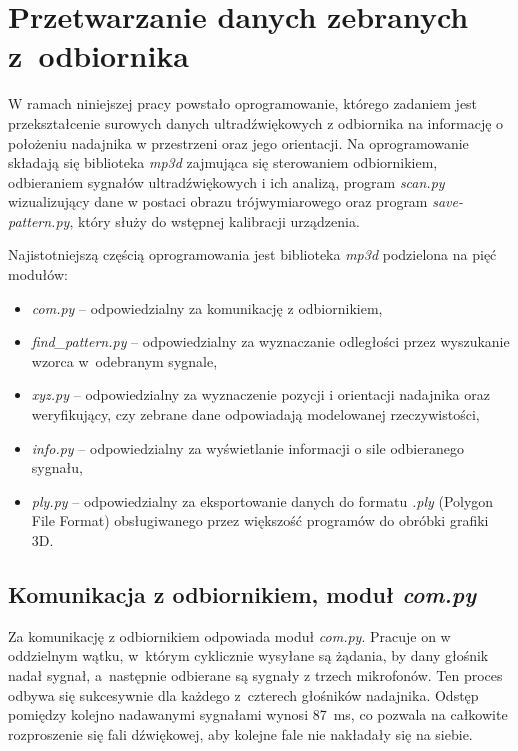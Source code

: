 
\chapter{Przetwarzanie danych zebranych z~odbiornika}

W ramach niniejszej pracy powstało oprogramowanie, którego zadaniem jest
przekształcenie surowych danych ultradźwiękowych 
z odbiornika na informację o położeniu nadajnika w przestrzeni oraz jego orientacji.
Na oprogramowanie składają się biblioteka \textit{mp3d} zajmująca się
sterowaniem odbiornikiem, odbieraniem sygnałów ultradźwiękowych i ich analizą, program \textit{scan.py}
wizualizujący dane w postaci obrazu trójwymiarowego oraz program \textit{save-pattern.py},
który służy do wstępnej kalibracji urządzenia.

Najistotniejszą częścią oprogramowania jest biblioteka \textit{mp3d} podzielona na pięć modułów:
\begin{itemize}
 \item \textit{com.py} --  odpowiedzialny za komunikację z odbiornikiem,
 \item \textit{find\_pattern.py} --  odpowiedzialny za wyznaczanie odległości przez wyszukanie wzorca w~odebranym sygnale,
 \item \textit{xyz.py} --  odpowiedzialny za wyznaczenie pozycji i orientacji nadajnika oraz  weryfikujący, 
 czy zebrane dane odpowiadają modelowanej rzeczywistości,
 \item \textit{info.py} --  odpowiedzialny za wyświetlanie informacji o sile odbieranego sygnału,
 \item \textit{ply.py} --  odpowiedzialny za eksportowanie danych do formatu \textit{.ply}
    (Polygon File Format) obsługiwanego przez większość programów do obróbki grafiki 3D.
\end{itemize}


\section{Komunikacja z odbiornikiem, moduł \textit{com.py}}

Za komunikację z odbiornikiem odpowiada moduł \textit{com.py}.
Pracuje on w oddzielnym wątku, w~którym cyklicznie wysyłane są żądania, by dany głośnik nadał sygnał,
a~następnie odbierane są sygnały z trzech mikrofonów.
Ten proces odbywa się sukcesywnie dla każdego z~czterech głośników nadajnika.
Odstęp pomiędzy kolejno nadawanymi sygnałami wynosi \SI{87}{ms},
co pozwala na całkowite rozproszenie się fali dźwiękowej, aby kolejne fale nie nakładały się na siebie.

